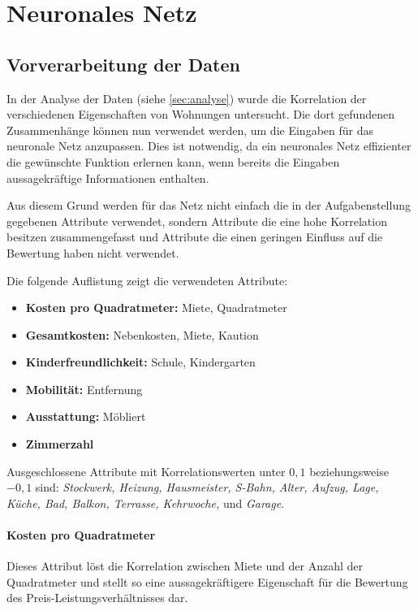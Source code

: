 \section{Neuronales Netz}\label{sec:nn}
\subsection{Vorverarbeitung der Daten}
In der Analyse der Daten (siehe \autoref{sec:analyse}) wurde die Korrelation
der verschiedenen Eigenschaften von Wohnungen untersucht. Die dort gefundenen
Zusammenhänge können nun verwendet werden, um die Eingaben für das neuronale
Netz anzupassen. Dies ist notwendig, da ein neuronales Netz effizienter
die gewünschte Funktion erlernen kann, wenn bereits die Eingaben aussagekräftige
Informationen enthalten.

Aus diesem Grund werden für das Netz nicht einfach die in der Aufgabenstellung
gegebenen Attribute verwendet, sondern Attribute die eine hohe Korrelation besitzen
zusammengefasst und Attribute die einen geringen Einfluss auf die Bewertung haben
nicht verwendet.

Die folgende Auflistung zeigt die verwendeten Attribute:
\begin{itemize}\label{lst:Eigenschaften}
    \item \textbf{Kosten pro Quadratmeter:} Miete, Quadratmeter
    \item \textbf{Gesamtkosten:} Nebenkosten, Miete, Kaution
    \item \textbf{Kinderfreundlichkeit:} Schule, Kindergarten
    \item \textbf{Mobilität:} Entfernung
    \item \textbf{Ausstattung:} Möbliert
    \item \textbf{Zimmerzahl}
\end{itemize}

Ausgeschlossene Attribute mit Korrelationswerten unter $0,1$ beziehungsweise $-0,1$ sind:
\emph{Stockwerk, Heizung, Hausmeister, S-Bahn, Alter, Aufzug, Lage, Küche, Bad, Balkon, Terrasse, Kehrwoche,}
und \emph{Garage}.

\paragraph{Kosten pro Quadratmeter}
Dieses Attribut löst die Korrelation zwischen Miete und der Anzahl der Quadratmeter und
stellt so eine aussagekräftigere Eigenschaft für die Bewertung des Preis-Leistungsverhältnisses dar.


